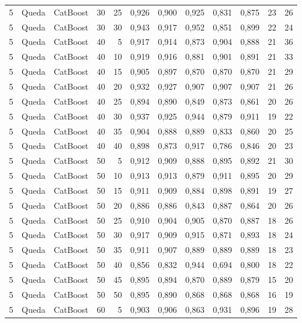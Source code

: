 \begin{longtable}{@{}rllrrrrrrrrr@{}}
5 & Queda & CatBoost & 30 & 25 & 0,926 & 0,900 & 0,925 & 0,831 & 0,875 & 23 & 26 \\
5 & Queda & CatBoost & 30 & 30 & 0,943 & 0,917 & 0,952 & 0,851 & 0,899 & 22 & 24 \\
5 & Queda & CatBoost & 40 & 5 & 0,917 & 0,914 & 0,873 & 0,904 & 0,888 & 21 & 36 \\
5 & Queda & CatBoost & 40 & 10 & 0,919 & 0,916 & 0,881 & 0,901 & 0,891 & 21 & 33 \\
5 & Queda & CatBoost & 40 & 15 & 0,905 & 0,897 & 0,870 & 0,870 & 0,870 & 21 & 29 \\
5 & Queda & CatBoost & 40 & 20 & 0,932 & 0,927 & 0,907 & 0,907 & 0,907 & 21 & 26 \\
5 & Queda & CatBoost & 40 & 25 & 0,894 & 0,890 & 0,849 & 0,873 & 0,861 & 20 & 26 \\
5 & Queda & CatBoost & 40 & 30 & 0,937 & 0,925 & 0,944 & 0,879 & 0,911 & 19 & 22 \\
5 & Queda & CatBoost & 40 & 35 & 0,904 & 0,888 & 0,889 & 0,833 & 0,860 & 20 & 25 \\
5 & Queda & CatBoost & 40 & 40 & 0,898 & 0,873 & 0,917 & 0,786 & 0,846 & 20 & 23 \\
5 & Queda & CatBoost & 50 & 5 & 0,912 & 0,909 & 0,888 & 0,895 & 0,892 & 21 & 30 \\
5 & Queda & CatBoost & 50 & 10 & 0,913 & 0,913 & 0,879 & 0,911 & 0,895 & 20 & 29 \\
5 & Queda & CatBoost & 50 & 15 & 0,911 & 0,909 & 0,884 & 0,898 & 0,891 & 19 & 27 \\
5 & Queda & CatBoost & 50 & 20 & 0,886 & 0,886 & 0,843 & 0,887 & 0,864 & 20 & 26 \\
5 & Queda & CatBoost & 50 & 25 & 0,910 & 0,904 & 0,905 & 0,870 & 0,887 & 18 & 26 \\
5 & Queda & CatBoost & 50 & 30 & 0,917 & 0,909 & 0,915 & 0,871 & 0,893 & 18 & 24 \\
5 & Queda & CatBoost & 50 & 35 & 0,911 & 0,907 & 0,889 & 0,889 & 0,889 & 18 & 23 \\
5 & Queda & CatBoost & 50 & 40 & 0,856 & 0,832 & 0,944 & 0,694 & 0,800 & 18 & 22 \\
5 & Queda & CatBoost & 50 & 45 & 0,895 & 0,894 & 0,870 & 0,889 & 0,879 & 15 & 20 \\
5 & Queda & CatBoost & 50 & 50 & 0,895 & 0,890 & 0,868 & 0,868 & 0,868 & 16 & 19 \\
5 & Queda & CatBoost & 60 & 5 & 0,903 & 0,906 & 0,863 & 0,931 & 0,896 & 19 & 28 \\

\end{longtable}

